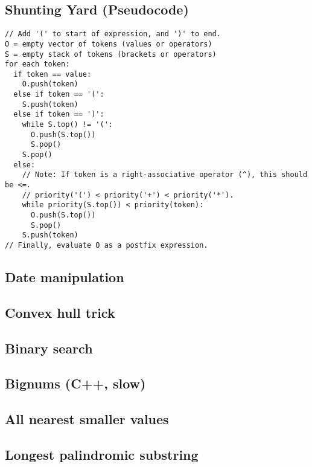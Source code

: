 \documentclass[9pt]{extarticle}
\begin{document}
\begin{multicols}{3}
\subsection{Shunting Yard (Pseudocode)}
\begin{lstlisting}
// Add '(' to start of expression, and ')' to end.
O = empty vector of tokens (values or operators)
S = empty stack of tokens (brackets or operators)
for each token:
  if token == value:
    O.push(token)
  else if token == '(':
    S.push(token)
  else if token == ')':
    while S.top() != '(':
      O.push(S.top())
      S.pop()
    S.pop()
  else:
    // Note: If token is a right-associative operator (^), this should be <=.
	// priority('(') < priority('+') < priority('*').
    while priority(S.top()) < priority(token):
      O.push(S.top())
      S.pop()
    S.push(token)
// Finally, evaluate O as a postfix expression.
\end{lstlisting}

\subsection{Date manipulation}


\subsection{Convex hull trick}


\subsection{Binary search}


\subsection{Bignums (C++, slow)}


\subsection{All nearest smaller values}


\subsection{Longest palindromic substring}


\end{multicols}
\end{document}
